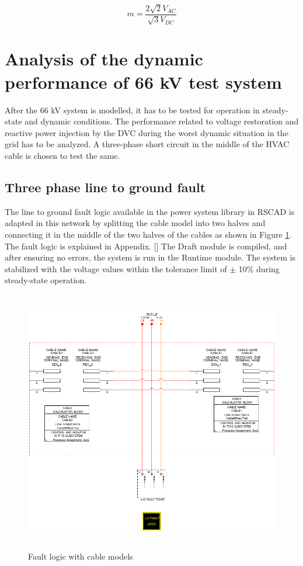 \begin{equation}\label{MI_eq}
    m = \frac{2\sqrt{2} V_{AC}}{\sqrt{3} {V_{DC}}}
\end{equation}

\section{Analysis of the dynamic performance of 66 kV test system}
After the 66 kV system is modelled, it has to be tested for operation in steady-state and dynamic conditions. The performance related to voltage restoration and reactive power injection by the \gls{DVC} during the worst dynamic situation in the grid has to be analyzed. A three-phase short circuit in the middle of the \gls{HVAC} cable is chosen to test the same.  
\subsection{Three phase line to ground fault}

The line to ground fault logic available in the power system library in RSCAD is adapted in this network by splitting the cable model into two halves and connecting it in the middle of the two halves of the cables as shown in Figure \ref{fig:2cablesblockwithfault}. The fault logic is explained in Appendix. [] 
The Draft module is compiled, and after ensuring no errors, the system is run in the Runtime module. The system is stabilized with the voltage values within the tolerance limit of $\pm$ 10\% during steady-state operation.

\begin{figure}[H]
\centering
    \includegraphics[height = 11.5cm,width = 12.5cm]{Diagrams/Chapter_3/2CablesBlockWithFault.png}
    \caption{Fault logic with cable models}
    \label{fig:2cablesblockwithfault}
\end{figure}

